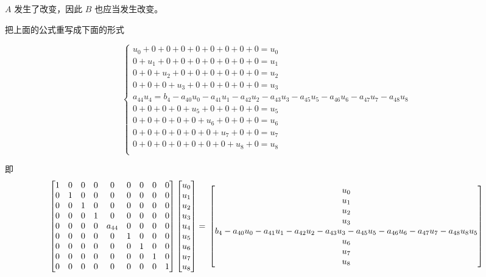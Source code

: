 \documentclass[12pt,a4paper]{article}
\begin{document}
$A$ 发生了改变，因此 $B$ 也应当发生改变。

把上面的公式重写成下面的形式

$$
\begin{cases}
u_0 + 0 + 0 + 0 + 0 + 0 + 0 + 0 + 0 = u_0 \\
0 + u_1 + 0 + 0 + 0 + 0 + 0 + 0 + 0 = u_1 \\
0 +  0 + u_2 +0 + 0 + 0 + 0 + 0 + 0 = u_2 \\
0 +  0 + 0 + u_3 +0 + 0 + 0 + 0 + 0 = u_3 \\
a_{44}u_{4} = b_4 -a_{40}u_0 - a_{41}u_1- a_{42}u_2-a_{43}u_3 -a_{45}u_5- a_{46}u_6- a_{47}u_7- a_{48}u_8 \\
0 +  0 + 0 + 0 + u_5 +0 + 0 + 0 + 0 = u_5 \\
0 +  0 + 0 + 0 + 0 +u_6 +0 + 0 + 0 = u_6 \\
0 +  0 + 0 + 0 + 0 + 0 + u_7 +0 + 0 = u_7 \\
0 +  0 + 0 + 0 + 0 + 0 + 0 + u_8 + 0 = u_8 \\
\end{cases}
$$

即
$$
\begin{bmatrix}
1 & 0 & 0 & 0 & 0 & 0 & 0 & 0 & 0 \\
0 & 1 & 0 & 0 & 0 & 0 & 0 & 0 & 0 \\
0 & 0 & 1 & 0 & 0 & 0 & 0 & 0 & 0 \\
0 & 0 & 0 & 1 & 0 & 0 & 0 & 0 & 0 \\
0 & 0 & 0 & 0 & a_{44} & 0 & 0 & 0 & 0\\
0 & 0 & 0 & 0 & 0 & 1 & 0 & 0 & 0\\
0 & 0 & 0 & 0 & 0 & 0 & 1 & 0 & 0 \\
0 & 0 & 0 & 0 & 0 & 0 & 0 & 1 & 0 \\
0 & 0 & 0 & 0 & 0 & 0 & 0 & 0 & 1 \\
\end{bmatrix}
\begin{bmatrix}
u_{0} \\
u_{1} \\
u_{2} \\
u_{3} \\
u_{4} \\
u_{5} \\
u_{6} \\
u_{7} \\
u_{8} \\
\end{bmatrix}=\\
\begin{bmatrix}
u_{0} \\
u_{1} \\
u_{2} \\
u_{3} \\
b_4-a_{40}u_0-a_{41}u_1-a_{42}u_2-a_{43}u_3-a_{45}u_5-a_{46}u_6-a_{47}u_7-a_{48}u_8
u_{5} \\
u_{6} \\
u_{7} \\
u_{8} \\
\end{bmatrix}
$$
\end{document}

